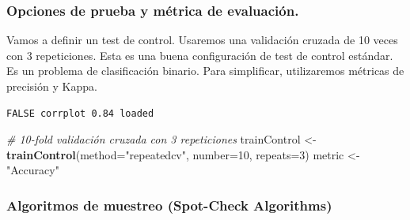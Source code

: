 \documentclass[]{article}
\newenvironment{Shaded}{\begin{snugshade}}{\end{snugshade}}
\newcommand{\KeywordTok}[1]{\textcolor[rgb]{0.13,0.29,0.53}{\textbf{#1}}}
\newcommand{\DataTypeTok}[1]{\textcolor[rgb]{0.13,0.29,0.53}{#1}}
\newcommand{\DecValTok}[1]{\textcolor[rgb]{0.00,0.00,0.81}{#1}}
\newcommand{\StringTok}[1]{\textcolor[rgb]{0.31,0.60,0.02}{#1}}
\newcommand{\CommentTok}[1]{\textcolor[rgb]{0.56,0.35,0.01}{\textit{#1}}}
\newcommand{\NormalTok}[1]{#1}
\begin{document}
\subsubsection{Opciones de prueba y métrica de
evaluación.}\label{opciones-de-prueba-y-metrica-de-evaluacion.}

Vamos a definir un test de control. Usaremos una validación cruzada de
10 veces con 3 repeticiones. Esta es una buena configuración de test de
control estándar. Es un problema de clasificación binario. Para
simplificar, utilizaremos métricas de precisión y Kappa.

\begin{verbatim}
FALSE corrplot 0.84 loaded
\end{verbatim}

\begin{Shaded}
\begin{Highlighting}[]
\CommentTok{# 10-fold validación cruzada con 3 repeticiones}
\NormalTok{trainControl <-}\StringTok{ }\KeywordTok{trainControl}\NormalTok{(}\DataTypeTok{method=}\StringTok{"repeatedcv"}\NormalTok{, }\DataTypeTok{number=}\DecValTok{10}\NormalTok{, }\DataTypeTok{repeats=}\DecValTok{3}\NormalTok{)}
\NormalTok{metric <-}\StringTok{ "Accuracy"}
\end{Highlighting}
\end{Shaded}

\subsubsection{Algoritmos de muestreo (Spot-Check
Algorithms)}\label{algoritmos-de-muestreo-spot-check-algorithms}
\end{document}
